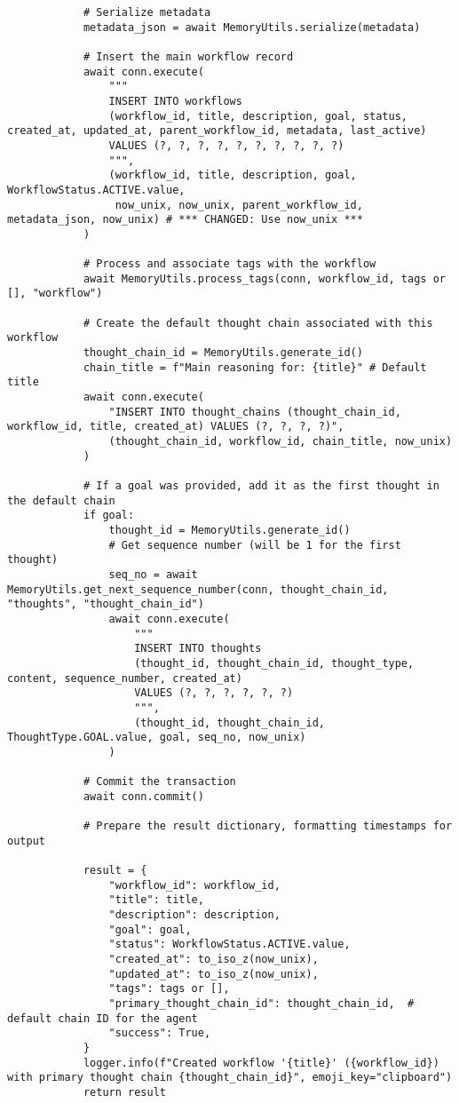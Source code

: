 \documentclass[12pt,a4paper]{article}
\begin{document}
\begin{pageablecode}
\begin{verbatim}
            # Serialize metadata
            metadata_json = await MemoryUtils.serialize(metadata)

            # Insert the main workflow record
            await conn.execute(
                """
                INSERT INTO workflows
                (workflow_id, title, description, goal, status, created_at, updated_at, parent_workflow_id, metadata, last_active)
                VALUES (?, ?, ?, ?, ?, ?, ?, ?, ?, ?)
                """,
                (workflow_id, title, description, goal, WorkflowStatus.ACTIVE.value,
                 now_unix, now_unix, parent_workflow_id, metadata_json, now_unix) # *** CHANGED: Use now_unix ***
            )

            # Process and associate tags with the workflow
            await MemoryUtils.process_tags(conn, workflow_id, tags or [], "workflow")

            # Create the default thought chain associated with this workflow
            thought_chain_id = MemoryUtils.generate_id()
            chain_title = f"Main reasoning for: {title}" # Default title
            await conn.execute(
                "INSERT INTO thought_chains (thought_chain_id, workflow_id, title, created_at) VALUES (?, ?, ?, ?)",
                (thought_chain_id, workflow_id, chain_title, now_unix)
            )

            # If a goal was provided, add it as the first thought in the default chain
            if goal:
                thought_id = MemoryUtils.generate_id()
                # Get sequence number (will be 1 for the first thought)
                seq_no = await MemoryUtils.get_next_sequence_number(conn, thought_chain_id, "thoughts", "thought_chain_id")
                await conn.execute(
                    """
                    INSERT INTO thoughts
                    (thought_id, thought_chain_id, thought_type, content, sequence_number, created_at)
                    VALUES (?, ?, ?, ?, ?, ?)
                    """,
                    (thought_id, thought_chain_id, ThoughtType.GOAL.value, goal, seq_no, now_unix)
                )

            # Commit the transaction
            await conn.commit()

            # Prepare the result dictionary, formatting timestamps for output

            result = {
                "workflow_id": workflow_id,
                "title": title,
                "description": description,
                "goal": goal,
                "status": WorkflowStatus.ACTIVE.value,
                "created_at": to_iso_z(now_unix),
                "updated_at": to_iso_z(now_unix),
                "tags": tags or [],
                "primary_thought_chain_id": thought_chain_id,  # default chain ID for the agent
                "success": True,
            }
            logger.info(f"Created workflow '{title}' ({workflow_id}) with primary thought chain {thought_chain_id}", emoji_key="clipboard")
            return result


\end{verbatim}
\end{pageablecode}
\end{document}
